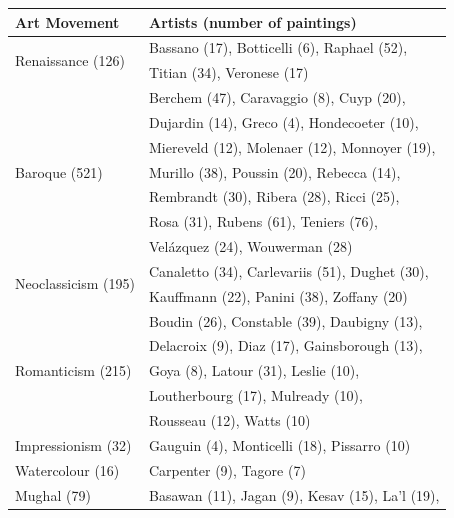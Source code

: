 \documentclass[11pt,a4paper,twoside,openright,draft]{report}
\begin{document}
\begin{multicols}{2}
\begin{table}[htp]
\centering
\begin{tabular}{|l|l|}
\toprule
Art Movement & Artists (number of paintings) \\
\bottomrule \toprule
\multirow{2}{*}{Renaissance (126)}
                     &  Bassano (17), Botticelli (6), Raphael (52), \\
                     &  Titian (34), Veronese (17)                  \\
\midrule
\multirow{7}{*}{Baroque (521)}
                     &  Berchem (47), Caravaggio (8), Cuyp (20),      \\
                     &  Dujardin (14), Greco (4), Hondecoeter (10),   \\
                     &  Miereveld (12), Molenaer (12), Monnoyer (19), \\
                     &  Murillo (38), Poussin (20), Rebecca (14),     \\
                     &  Rembrandt (30), Ribera (28), Ricci (25),      \\
                     &  Rosa (31), Rubens (61), Teniers (76),         \\
                     &  Vel\'azquez (24), Wouwerman (28)              \\
\midrule
\multirow{2}{*}{Neoclassicism (195)}
                     &  Canaletto (34), Carlevariis (51), Dughet (30), \\
                     &  Kauffmann (22), Panini (38), Zoffany (20)      \\
\midrule
\multirow{5}{*}{Romanticism (215)}
                     &  Boudin (26), Constable (39), Daubigny (13),  \\
                     &  Delacroix (9), Diaz (17), Gainsborough (13), \\
                     &  Goya (8), Latour (31), Leslie (10),          \\
                     &  Loutherbourg (17), Mulready (10),            \\
                     &  Rousseau (12),  Watts (10)                   \\
\midrule
Impressionism (32)   &  Gauguin (4), Monticelli (18), Pissarro (10) \\
\bottomrule \toprule
Watercolour (16)     &  Carpenter (9), Tagore (7) \\
\midrule
\multirow{2}{*}{Mughal (79)}
                     &  Basawan (11), Jagan (9), Kesav (15), La'l (19), \\

\end{tabular}
\end{table}
\end{multicols}
\end{document}

